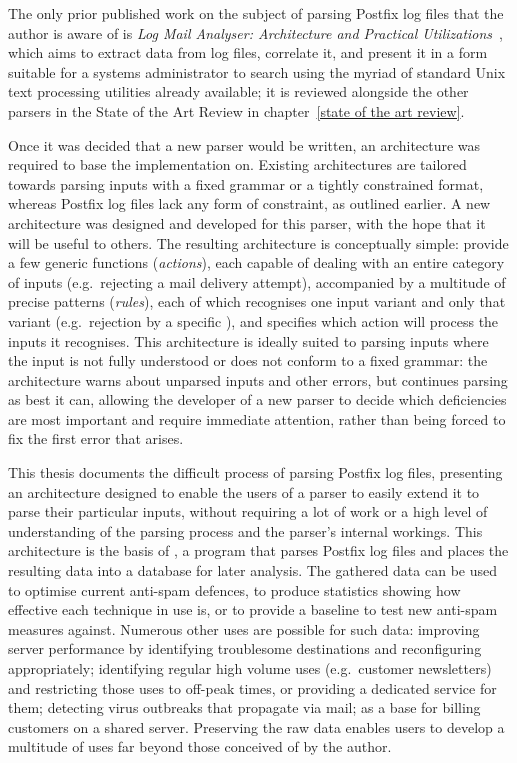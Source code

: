 The only prior published work on the subject of parsing Postfix log files
that the author is aware of is \textit{Log Mail Analyser: Architecture and
Practical Utilizations\/}~\cite{log-mail-analyser}, which aims to extract
data from log files, correlate it, and present it in a form suitable for a
systems administrator to search using the myriad of standard Unix text
processing utilities already available; it is reviewed alongside the other
parsers in the State of the Art Review in chapter~\ref{state of the art
review}.

Once it was decided that a new parser would be written, an architecture was
required to base the implementation on.  Existing architectures are
tailored towards parsing inputs with a fixed grammar or a tightly
constrained format, whereas Postfix log files lack any form of constraint,
as outlined earlier.  A new architecture was designed and developed for
this parser, with the hope that it will be useful to others.  The resulting
architecture is conceptually simple: provide a few generic functions
(\textit{actions\/}), each capable of dealing with an entire category of
inputs (e.g.\ rejecting a mail delivery attempt), accompanied by a
multitude of precise patterns (\textit{rules\/}), each of which recognises
one input variant and only that variant (e.g.\ rejection by a specific
), and specifies which action will process the inputs it
recognises.  This architecture is ideally suited to parsing inputs
where the input is not fully understood or does not conform to a fixed
grammar: the architecture warns about unparsed inputs and other errors, but
continues parsing as best it can, allowing the developer of a new parser to
decide which deficiencies are most important and require immediate
attention, rather than being forced to fix the first error that arises.

This thesis documents the difficult process of parsing Postfix log files,
presenting an architecture designed to enable the users of a parser to
easily extend it to parse their particular inputs, without requiring a lot
of work or a high level of understanding of the parsing process and the
parser's internal workings.  This architecture is the basis of
\parsername{}, a program that parses Postfix log files and places the
resulting data into a database for later analysis.  The gathered data can
be used to optimise current anti-spam defences, to produce statistics
showing how effective each technique in use is, or to provide a baseline to
test new anti-spam measures against.  Numerous other uses are possible for
such data: improving server performance by identifying troublesome
destinations and reconfiguring appropriately; identifying regular high
volume uses (e.g.\ customer newsletters) and restricting those uses to
off-peak times, or providing a dedicated service for them; detecting virus
outbreaks that propagate via mail; as a base for billing customers on a
shared server.  Preserving the raw data enables users to develop a
multitude of uses far beyond those conceived of by the author.

